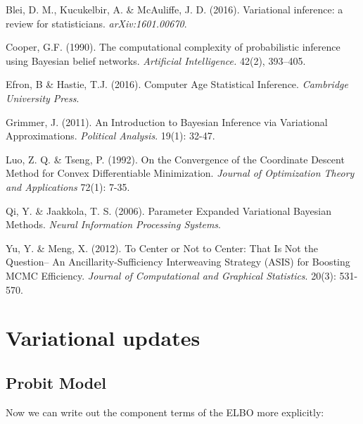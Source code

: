 \documentclass{article}
\begin{document}
\begin{thebibliography}{10}

 Blei, D. M., Kucukelbir, A. \& McAuliffe, J. D. (2016). Variational inference: a review for statisticians. {\itshape arXiv:1601.00670}.

 Cooper, G.F. (1990). The computational complexity of probabilistic inference using Bayesian belief networks. {\sl Artificial Intelligence.} 42(2), 393–405.

 Efron, B \& Hastie, T.J. (2016). Computer Age Statistical Inference. {\itshape Cambridge University Press}.

 Grimmer, J. (2011). An Introduction to Bayesian Inference via Variational Approximations. {\itshape Political Analysis}. 19(1): 32-47.

 Luo, Z. Q. \& Tseng, P. (1992). On the Convergence of the Coordinate Descent Method for Convex Differentiable Minimization. {\itshape Journal of Optimization Theory and Applications} 72(1): 7-35. 

 Qi, Y. \& Jaakkola, T. S. (2006). Parameter Expanded Variational Bayesian Methods. {\itshape Neural Information Processing Systems}. 

 Yu, Y. \& Meng, X. (2012). To Center or Not to Center: That Is Not the
Question-- An Ancillarity-Sufficiency Interweaving Strategy (ASIS) for Boosting MCMC Efficiency. {\itshape Journal of Computational and Graphical Statistics}. 20(3): 531-570. 
\end{thebibliography}

\newpage

\appendix

\section{Variational updates}
\label{vi}
\subsection{Probit Model}
\label{probit}


 Now we can write out the component terms of the ELBO more explicitly:

\end{document}
